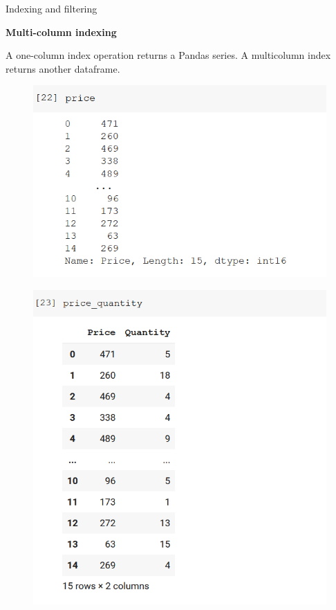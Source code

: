 \documentclass[aspectratio=169]{beamer}
\begin{document}
\begin{frame}{Indexing and filtering}

	\textbf{Multi-column indexing}

	A one-column index operation returns a Pandas series. A multicolumn index returns another dataframe.

	\begin{multicols}{2}

		\begin{figure}
			\centering
			\includegraphics[width=0.7\linewidth]{img/price.png}
		\end{figure}
		\begin{figure}
			\centering
			\includegraphics[width=0.7\linewidth]{img/price_quantity.png}
		\end{figure}

	\end{multicols}

\end{frame}
\end{document}
